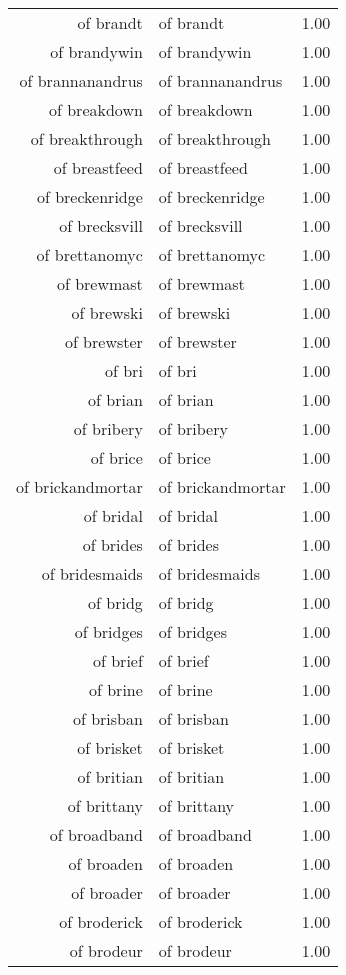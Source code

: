 \begin{table}[ht]
\begin{tabular}{rlr}
  of brandt & of brandt & 1.00 \\ 
  of brandywin & of brandywin & 1.00 \\ 
  of brannanandrus & of brannanandrus & 1.00 \\ 
  of breakdown & of breakdown & 1.00 \\ 
  of breakthrough & of breakthrough & 1.00 \\ 
  of breastfeed & of breastfeed & 1.00 \\ 
  of breckenridge & of breckenridge & 1.00 \\ 
  of brecksvill & of brecksvill & 1.00 \\ 
  of brettanomyc & of brettanomyc & 1.00 \\ 
  of brewmast & of brewmast & 1.00 \\ 
  of brewski & of brewski & 1.00 \\ 
  of brewster & of brewster & 1.00 \\ 
  of bri & of bri & 1.00 \\ 
  of brian & of brian & 1.00 \\ 
  of bribery & of bribery & 1.00 \\ 
  of brice & of brice & 1.00 \\ 
  of brickandmortar & of brickandmortar & 1.00 \\ 
  of bridal & of bridal & 1.00 \\ 
  of brides & of brides & 1.00 \\ 
  of bridesmaids & of bridesmaids & 1.00 \\ 
  of bridg & of bridg & 1.00 \\ 
  of bridges & of bridges & 1.00 \\ 
  of brief & of brief & 1.00 \\ 
  of brine & of brine & 1.00 \\ 
  of brisban & of brisban & 1.00 \\ 
  of brisket & of brisket & 1.00 \\ 
  of britian & of britian & 1.00 \\ 
  of brittany & of brittany & 1.00 \\ 
  of broadband & of broadband & 1.00 \\ 
  of broaden & of broaden & 1.00 \\ 
  of broader & of broader & 1.00 \\ 
  of broderick & of broderick & 1.00 \\ 
  of brodeur & of brodeur & 1.00 \\ 

\end{tabular}
\end{table}
